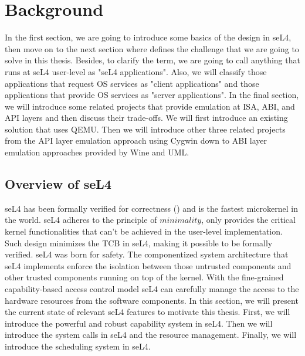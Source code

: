 \chapter{Background}\label{ch:background}

In the first section, we are going to introduce some basics of the design in seL4, then move on to the next section where defines the challenge that we are going to solve in this thesis. Besides, to clarify the term, we are going to call anything that runs at seL4 user-level as "seL4 applications". Also, we will classify those applications that request OS services as "client applications" and those applications that provide OS services as "server applications". In the final section, we will introduce some related projects that provide emulation at ISA, ABI, and API layers and then discuss their trade-offs. We will first introduce an existing solution that uses QEMU. Then we will introduce other three related projects from the API layer emulation approach using Cygwin down to ABI layer emulation approaches provided by Wine and UML.  

\vspace*{-\dimexpr1.0ex+0.1\baselineskip\relax}

\section{Overview of seL4}

seL4 has been formally verified for correctness (\cite{Klein_EHACDEEKNSTW_09}) and is the fastest microkernel in the world. seL4 adheres to the principle of $minimality$, only provides the critical kernel functionalities that can't be achieved in the user-level implementation. Such design minimizes the TCB in seL4, making it possible to be formally verified. seL4 was born for safety. The componentized system architecture that seL4 implements enforce the isolation between those untrusted components and other trusted components running on top of the kernel. With the fine-grained capability-based access control model seL4 can carefully manage the access to the hardware resources from the software components. In this section, we will present the current state of relevant seL4 features to motivate this thesis. First, we will introduce the powerful and robust capability system in seL4. Then we will introduce the system calls in seL4 and the resource management. Finally, we will introduce the scheduling system in seL4.



